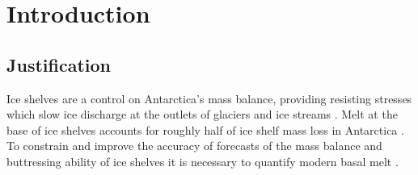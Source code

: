 \label{ch:apres}



\section{Introduction}



\subsection{Justification}

Ice shelves are a control on Antarctica's mass balance, providing resisting stresses  which slow ice discharge at the outlets of glaciers and ice streams  \citep{de2003glacier,gudmundsson2003transmission,dupont2005assessment}.
Melt at the base of ice shelves accounts for roughly half of  ice shelf mass loss in Antarctica \citep{rignot2013ice}. To constrain and improve the accuracy of  forecasts of the mass balance and buttressing ability of ice shelves it is necessary to quantify modern basal melt  \citep[e.g.][] {furst2016safety}. 


